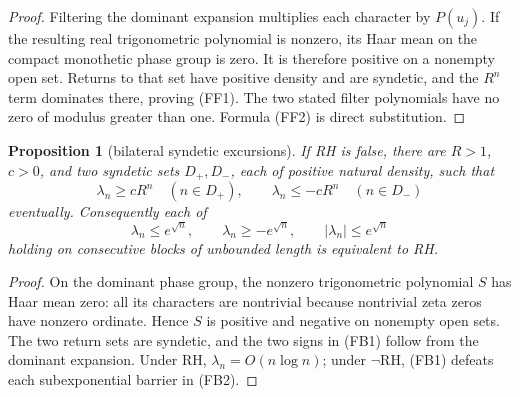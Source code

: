 \documentclass[11pt]{amsart}
\newtheorem{proposition}[theorem]{Proposition}
\theoremstyle{definition}
\theoremstyle{remark}
\theoremstyle{definition}
\newcommand{\RH}{\mathrm{RH}}
\begin{document}
\begin{proof}
Filtering the dominant expansion multiplies each character by $P(u_j)$.
If the resulting real trigonometric polynomial is nonzero, its Haar mean on
the compact monothetic phase group is zero.  It is therefore positive on a
nonempty open set.  Returns to that set have positive density and are
syndetic, and the $R^n$ term dominates there, proving (FF1).  The two stated
filter polynomials have no zero of modulus greater than one.  Formula (FF2)
is direct substitution.
\end{proof}

\begin{proposition}[bilateral syndetic excursions]
\label{prop:li-bilateral-excursions}
If RH is false, there are $R>1$, $c>0$, and two syndetic sets
$D_+,D_-$, each of positive natural density, such that
\[
 \lambda_n\ge cR^n\quad(n\in D_+),\qquad
 \lambda_n\le-cR^n\quad(n\in D_-)                         \tag{FB1}
\]
eventually.  Consequently each of
\[
 \lambda_n\le e^{\sqrt n},\qquad
 \lambda_n\ge-e^{\sqrt n},\qquad
 |\lambda_n|\le e^{\sqrt n}                               \tag{FB2}
\]
holding on consecutive blocks of unbounded length is equivalent to RH.
\end{proposition}

\begin{proof}
On the dominant phase group, the nonzero trigonometric polynomial $S$ has
Haar mean zero: all its characters are nontrivial because nontrivial zeta
zeros have nonzero ordinate.  Hence $S$ is positive and negative on
nonempty open sets.  The two return sets are syndetic, and the two signs in
(FB1) follow from the dominant expansion.  Under RH,
$\lambda_n=O(n\log n)$; under $\neg\RH$, (FB1) defeats each subexponential
barrier in (FB2).
\end{proof}
\end{document}
